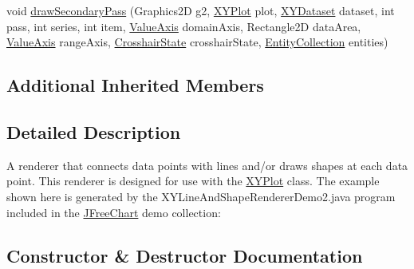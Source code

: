 \begin{DoxyCompactItemize}
void \mbox{\hyperlink{classorg_1_1jfree_1_1chart_1_1renderer_1_1xy_1_1_x_y_line_and_shape_renderer_aa25a14e877854b4976d884e097e60938}{draw\+Secondary\+Pass}} (Graphics2D g2, \mbox{\hyperlink{classorg_1_1jfree_1_1chart_1_1plot_1_1_x_y_plot}{X\+Y\+Plot}} plot, \mbox{\hyperlink{interfaceorg_1_1jfree_1_1data_1_1xy_1_1_x_y_dataset}{X\+Y\+Dataset}} dataset, int pass, int series, int item, \mbox{\hyperlink{classorg_1_1jfree_1_1chart_1_1axis_1_1_value_axis}{Value\+Axis}} domain\+Axis, Rectangle2D data\+Area, \mbox{\hyperlink{classorg_1_1jfree_1_1chart_1_1axis_1_1_value_axis}{Value\+Axis}} range\+Axis, \mbox{\hyperlink{classorg_1_1jfree_1_1chart_1_1plot_1_1_crosshair_state}{Crosshair\+State}} crosshair\+State, \mbox{\hyperlink{interfaceorg_1_1jfree_1_1chart_1_1entity_1_1_entity_collection}{Entity\+Collection}} entities)
\end{DoxyCompactItemize}
\subsection*{Additional Inherited Members}


\subsection{Detailed Description}
A renderer that connects data points with lines and/or draws shapes at each data point. This renderer is designed for use with the \mbox{\hyperlink{}{X\+Y\+Plot}} class. The example shown here is generated by the {\ttfamily X\+Y\+Line\+And\+Shape\+Renderer\+Demo2.\+java} program included in the \mbox{\hyperlink{classorg_1_1jfree_1_1chart_1_1_j_free_chart}{J\+Free\+Chart}} demo collection\+: ~\newline
~\newline
  

\subsection{Constructor \& Destructor Documentation}
\mbox{\label{classorg_1_1jfree_1_1chart_1_1renderer_1_1xy_1_1_x_y_line_and_shape_renderer_af843798c4bd0e8e24e967e19a90eedfc}} 

